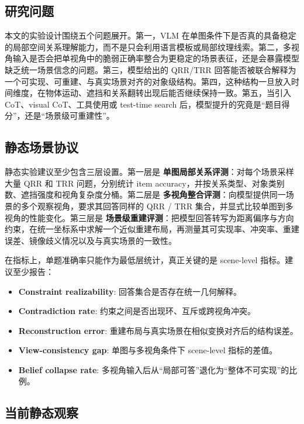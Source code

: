 \subsection{研究问题}

本文的实验设计围绕五个问题展开。第一，VLM 在单图条件下是否真的具备稳定的局部空间关系理解能力，而不是只会利用语言模板或局部纹理线索。第二，多视角输入是否会把单视角中的脆弱正确率整合为更稳定的场景表征，还是会暴露模型缺乏统一场景信念的问题。第三，模型给出的 QRR/TRR 回答能否被联合解释为一个可实现、可重建、与真实场景对齐的对象级结构。第四，这种结构一旦放入时间维度，在物体运动、遮挡和关系翻转出现后能否继续保持一致。第五，当引入 CoT、visual CoT、工具使用或 test-time search 后，模型提升的究竟是“题目得分”，还是“场景级可重建性”。

\subsection{静态场景协议}

静态实验建议至少包含三层设置。第一层是 \textbf{单图局部关系评测}：对每个场景采样大量 QRR 和 TRR 问题，分别统计 item accuracy，并按关系类型、对象类别数、遮挡强度和视角复杂度分桶。第二层是 \textbf{多视角整合评测}：向模型提供同一场景的多个观察视角，要求其回答同样的 QRR / TRR 集合，并显式比较单图到多视角的性能变化。第三层是 \textbf{场景级重建评测}：把模型回答转写为距离偏序与方向约束，在统一坐标系中求解一个近似重建布局，再测量其可实现率、冲突率、重建误差、镜像歧义情况以及与真实场景的一致性。

在指标上，单题准确率只能作为最低层统计，真正关键的是 scene-level 指标。建议至少报告：
\begin{itemize}[leftmargin=1.5em]
\item \textbf{Constraint realizability}: 回答集合是否存在统一几何解释。
\item \textbf{Contradiction rate}: 约束之间是否出现环、互斥或跨视角冲突。
\item \textbf{Reconstruction error}: 重建布局与真实场景在相似变换对齐后的结构误差。
\item \textbf{View-consistency gap}: 单图与多视角条件下 scene-level 指标的差值。
\item \textbf{Belief collapse rate}: 多视角输入后从“局部可答”退化为“整体不可实现”的比例。
\end{itemize}

\subsection{当前静态观察}

